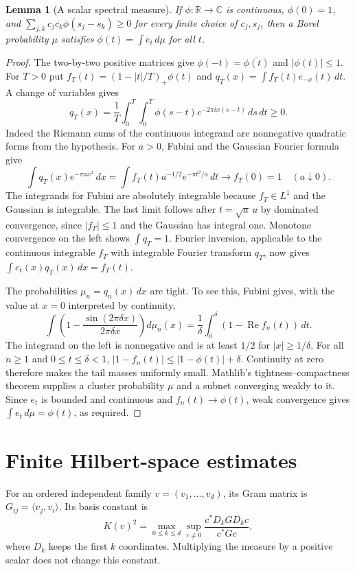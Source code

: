 \documentclass[reqno,a4paper,12pt]{amsart}
\newtheorem{lemma}[theorem]{Lemma}
\newcommand{\R}{\mathbb R}
\newcommand{\C}{\mathbb C}
\newcommand{\ip}[2]{\langle #1,#2\rangle}
\begin{document}
\begin{lemma}[A scalar spectral measure]\label{bochner}
If $\phi:\R\to\C$ is continuous, $\phi(0)=1$, and
$\sum_{j,k}c_j\overline{c_k}\phi(s_j-s_k)\ge0$ for every finite choice
of $c_j,s_j$, then a Borel probability $\mu$ satisfies
$\phi(t)=\int e_t\,d\mu$ for all $t$.
\end{lemma}
\begin{proof}
The two-by-two positive matrices give
$\phi(-t)=\overline{\phi(t)}$ and $|\phi(t)|\le1$.
For $T>0$ put $f_T(t)=(1-|t|/T)_+\phi(t)$ and
$q_T(x)=\int f_T(t)e_{-x}(t)\,dt$. A change of variables gives
\[
 q_T(x)=\frac1T\int_0^T\int_0^T
 \phi(s-t)e^{-2\pi ix(s-t)}\,ds\,dt\ge0.
\]
Indeed the Riemann sums of the continuous integrand are nonnegative
quadratic forms from the hypothesis. For $a>0$, Fubini and the Gaussian
Fourier formula give
\[
 \int q_T(x)e^{-\pi a x^2}\,dx
 =\int f_T(t)a^{-1/2}e^{-\pi t^2/a}\,dt\longrightarrow f_T(0)=1
 \quad(a\downarrow0).
\]
The integrands for Fubini are absolutely integrable because $f_T\in L^1$
and the Gaussian is integrable. The last limit follows after $t=\sqrt a\,u$
by dominated convergence, since $|f_T|\le1$ and the Gaussian has integral one.
Monotone convergence on the left shows $\int q_T=1$.
Fourier inversion, applicable to the continuous integrable $f_T$ with
integrable Fourier transform $q_T$, now gives
$\int e_t(x)q_T(x)\,dx=f_T(t)$.

The probabilities $\mu_n=q_n(x)\,dx$ are tight. To see this, Fubini gives,
with the value at $x=0$ interpreted by continuity,
\[
 \int\left(1-\frac{\sin(2\pi\delta x)}{2\pi\delta x}\right)d\mu_n(x)
 =\frac1\delta\int_0^\delta(1-\operatorname{Re}f_n(t))\,dt.
\]
The integrand on the left is nonnegative and is at least $1/2$ for
$|x|\ge1/\delta$. For all $n\ge1$ and $0\le t\le\delta<1$,
$|1-f_n(t)|\le|1-\phi(t)|+\delta$.
Continuity at zero therefore makes the tail masses uniformly small.
Mathlib's tightness--compactness theorem supplies a cluster probability
$\mu$ and a subnet converging weakly to it. Since $e_t$ is bounded and
continuous and $f_n(t)\to\phi(t)$, weak convergence gives
$\int e_t\,d\mu=\phi(t)$, as required.
\end{proof}

\section{Finite Hilbert-space estimates}
For an ordered independent family $v=(v_1,\ldots,v_d)$, its Gram matrix
is $G_{ij}=\ip{v_j}{v_i}$. Its basis constant is
\[
 K(v)^2=\max_{0\le k\le d}\sup_{c\ne0}
 \frac{c^*D_kGD_kc}{c^*Gc},
\]
where $D_k$ keeps the first $k$ coordinates. Multiplying the measure by
a positive scalar does not change this constant.
\end{document}
